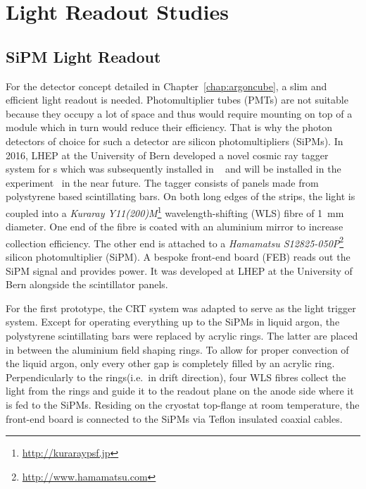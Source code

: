 \chapter{Light Readout Studies}
\label{chap:light-ro}



\section{SiPM Light Readout}
\label{sec:rd-dune-nd_light}

For the \AC{} detector concept detailed in Chapter~\ref{chap:argoncube}, a slim and efficient light readout is needed.
Photomultiplier tubes (PMTs) are not suitable because they occupy a lot of space and thus would require mounting on top of a module which in turn would reduce their efficiency.
That is why the photon detectors of choice for such a detector are silicon photomultipliers (SiPMs).
In 2016, LHEP at the University of Bern developed a novel cosmic ray tagger system for \lartpc{}s which was subsequently installed in \uboone{}~\cite{uboone} and will be installed in the \sbnd{} experiment~\cite{sbnd} in the near future.
The tagger consists of panels made from polystyrene based scintillating bars.
On both long edges of the strips, the light is coupled into a \emph{Kuraray Y11(200)M}\footnote{\url{http://kuraraypsf.jp}} wavelength-shifting (WLS) fibre of \SI{1}{\milli\metre} diameter.
One end of the fibre is coated with an aluminium mirror to increase collection efficiency.
The other end is attached to a \emph{Hamamatsu S12825-050P}\footnote{\url{http://www.hamamatsu.com}} silicon photomultiplier (SiPM).
A bespoke front-end board (FEB) reads out the SiPM signal and provides power.
It was developed at LHEP at the University of Bern alongside the scintillator panels\cite{crt_feb}.

For the first prototype, the CRT system was adapted to serve as the light trigger system.
Except for operating everything up to the SiPMs in liquid argon, the polystyrene scintillating bars were replaced by acrylic rings.
The latter are placed in between the aluminium field shaping rings.
To allow for proper convection of the liquid argon, only every other gap is completely filled by an acrylic ring.
Perpendicularly to the rings(i.e.\ in drift direction), four WLS fibres collect the light from the rings and guide it to the readout plane on the anode side where it is fed to the SiPMs.
Residing on the cryostat top-flange at room temperature, the front-end board is connected to the SiPMs via Teflon insulated coaxial cables.


